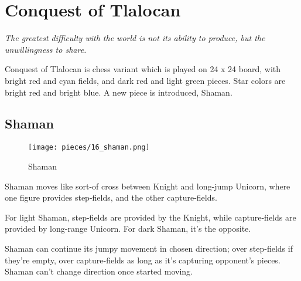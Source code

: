 

\chapter*{Conquest of Tlalocan}
\label{ch:Conquest of Tlalocan}

\begin{flushright}
\parbox{0.78\textwidth}{
\emph{The greatest difficulty with the world is not its ability to produce, but the unwillingness to share. \newline
{} } }
\end{flushright}

\noindent
Conquest of Tlalocan is chess variant which is played on 24 x 24 board,
with bright red and cyan fields, and dark red and light green pieces.
Star colors are bright red and bright blue.
A new piece is introduced, Shaman.

\clearpage %

\section*{Shaman}
\label{sec:Conquest of Tlalocan/Shaman}

\noindent
\begin{wrapfigure}[11]{l}{0.4\textwidth}
\centering
\texttt{[image: pieces/16\_shaman.png]}
\caption{Shaman}
\label{fig:16_shaman}
\end{wrapfigure}
Shaman moves like sort-of cross between Knight and long-jump Unicorn,
where one figure provides step-fields, and the other capture-fields.

For light Shaman, step-fields are provided by the Knight, while capture-fields
are provided by long-range Unicorn. For dark Shaman, it's the opposite.

Shaman can continue its jumpy movement in chosen direction; over step-fields
if they're empty, over capture-fields as long as it's capturing opponent's
pieces. Shaman can't change direction once started moving.

